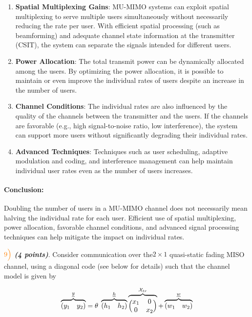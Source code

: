 \documentclass[11pt]{article}
\begin{document}
\begin{enumerate}
\def\labelenumi{\arabic{enumi}.}
\item
  \textbf{Spatial Multiplexing Gains}: MU-MIMO systems can exploit
  spatial multiplexing to serve multiple users simultaneously without
  necessarily reducing the rate per user. With efficient spatial
  processing (such as beamforming) and adequate channel state
  information at the transmitter (CSIT), the system can separate the
  signals intended for different users.
\item
  \textbf{Power Allocation}: The total transmit power can be dynamically
  allocated among the users. By optimizing the power allocation, it is
  possible to maintain or even improve the individual rates of users
  despite an increase in the number of users.
\item
  \textbf{Channel Conditions}: The individual rates are also influenced
  by the quality of the channels between the transmitter and the users.
  If the channels are favorable (e.g., high signal-to-noise ratio, low
  interference), the system can support more users without significantly
  degrading their individual rates.
\item
  \textbf{Advanced Techniques}: Techniques such as user scheduling,
  adaptive modulation and coding, and interference management can help
  maintain individual user rates even as the number of users increases.
\end{enumerate}

\paragraph{Conclusion:}\label{conclusion}

Doubling the number of users in a MU-MIMO channel does not necessarily
mean halving the individual rate for each user. Efficient use of spatial
multiplexing, power allocation, favorable channel conditions, and
advanced signal processing techniques can help mitigate the impact on
individual rates.

    \(\color{orange}9\Bigl)\) \textbf{\emph{(4 points)}}. Consider
communication over the\(2 \times 1\) quasi-static fading MISO channel,
using a diagonal code (see below for details) such that the channel
model is given by

\[
\overbrace{(y_1 \quad y_2)}^{\underline{y}} = \theta \; \overbrace{(h_1 \quad h_2)}^{\underline{h}} \overbrace{\Bigl(\begin{matrix} x_1&0 \\ 0&x_2 \end{matrix} \Bigr)}^{\mathcal{X}_{tr}} + \overbrace{(w_1 \quad w_2)}^{\underline{w}}
\]
\end{document}
